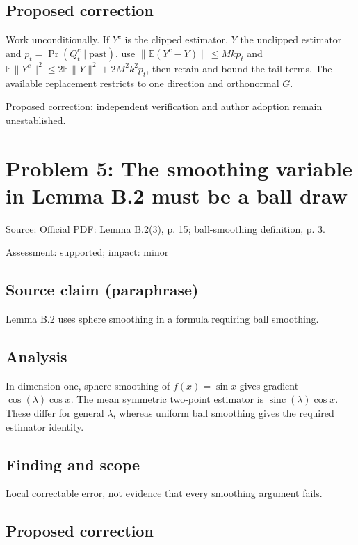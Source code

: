 \documentclass[11pt]{article}
\begin{document}
\subsection*{Proposed correction}

Work unconditionally. If \(Y^c\) is the clipped estimator, \(Y\) the unclipped estimator and \(p_t=\Pr(Q_t^c\mid\text{past})\), use \(\|\mathbb E(Y^c-Y)\|\le Mk p_t\) and \(\mathbb E\|Y^c\|^2\le2\mathbb E\|Y\|^2+2M^2k^2p_t\), then retain and bound the tail terms. The available replacement restricts to one direction and orthonormal \(G\).

Proposed correction; independent verification and author adoption remain unestablished.

\section*{Problem 5: The smoothing variable in Lemma B.2 must be a ball draw}

Source: Official PDF: Lemma B.2(3), p. 15; ball-smoothing definition, p. 3.

Assessment: supported; impact: minor

\subsection*{Source claim (paraphrase)}

Lemma B.2 uses sphere smoothing in a formula requiring ball smoothing.

\subsection*{Analysis}

In dimension one, sphere smoothing of \(f(x)=\sin x\) gives gradient \(\cos(\lambda)\cos x\). The mean symmetric two-point estimator is \(\operatorname{sinc}(\lambda)\cos x\). These differ for general \(\lambda\), whereas uniform ball smoothing gives the required estimator identity.

\subsection*{Finding and scope}

Local correctable error, not evidence that every smoothing argument fails.

\subsection*{Proposed correction}
\end{document}
